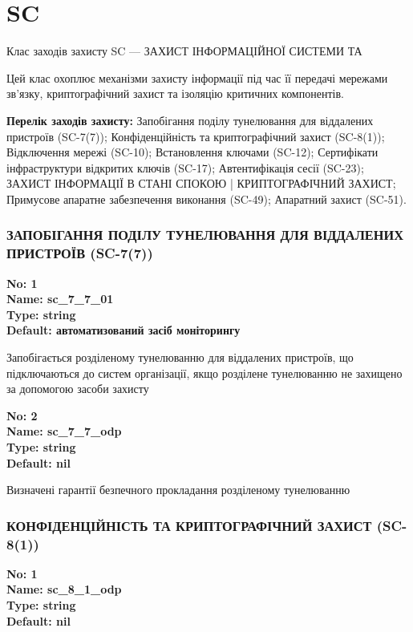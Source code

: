 \documentclass{article}
\begin{document}
\section{SC}
Клас заходів захисту SC --- ЗАХИСТ ІНФОРМАЦІЙНОЇ СИСТЕМИ ТА

Цей клас охоплює механізми захисту інформації під час її передачі мережами зв'язку, криптографічний захист та ізоляцію критичних компонентів.

\textbf{Перелік заходів захисту:} Запобігання поділу тунелювання для віддалених пристроїв (SC-7(7)); Конфіденційність та криптографічний захист (SC-8(1)); Відключення мережі (SC-10); Встановлення ключами (SC-12); Сертифікати інфраструктури відкритих ключів (SC-17); Автентифікація сесії (SC-23); ЗАХИСТ ІНФОРМАЦІЇ В СТАНІ СПОКОЮ | КРИПТОГРАФІЧНИЙ ЗАХИСТ; Примусове апаратне забезпечення виконання (SC-49); Апаратний захист (SC-51).

\subsubsection{ЗАПОБІГАННЯ ПОДІЛУ ТУНЕЛЮВАННЯ ДЛЯ ВІДДАЛЕНИХ ПРИСТРОЇВ (SC-7(7))}


\vspace{10pt}
{\footnotesize\bfseries
No: 1\\
Name: sc\_\allowbreak{}7\_\allowbreak{}7\_\allowbreak{}01\\
Type: string\\
Default: \textquotedbl{}автоматизований засіб моніторингу\textquotedbl{}
}

{\footnotesize Запобігається розділеному тунелюванню для віддалених пристроїв, що підключаються до систем організації, якщо розділене тунелюванню не захищено за допомогою засоби захисту}


{\footnotesize\bfseries
No: 2\\
Name: sc\_\allowbreak{}7\_\allowbreak{}7\_\allowbreak{}odp\\
Type: string\\
Default: nil
}

{\footnotesize Визначені гарантії безпечного прокладання розділеному тунелюванню}




\subsubsection{КОНФІДЕНЦІЙНІСТЬ ТА КРИПТОГРАФІЧНИЙ ЗАХИСТ (SC-8(1))}


\vspace{10pt}
{\footnotesize\bfseries
No: 1\\
Name: sc\_\allowbreak{}8\_\allowbreak{}1\_\allowbreak{}odp\\
Type: string\\
Default: nil
}
\end{document}
